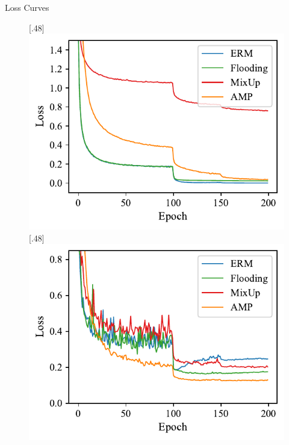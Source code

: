 \begin{frame}{Loss Curves}

\begin{figure}
[.48\textwidth]{\includegraphics[width=.45\textwidth]{figs/cifar10_preactresnet18_train_loss.pdf}}
[.48\textwidth]{\includegraphics[width=.45\textwidth]{figs/cifar10_preactresnet18_test_loss.pdf}}
\end{figure}

\end{frame}

